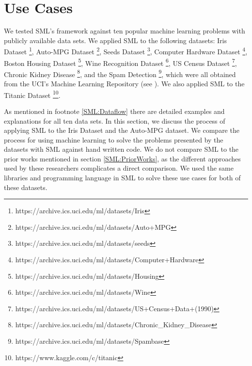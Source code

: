 \section{Use Cases}
\label{use-cases}

We tested SML's framework against ten popular machine learning problems with publicly available data sets. We applied SML to the following datasets: Iris Dataset \footnote{https://archive.ics.uci.edu/ml/datasets/Iris}, Auto-MPG Dataset \footnote{https://archive.ics.uci.edu/ml/datasets/Auto+MPG}, Seeds Dataset \footnote{https://archive.ics.uci.edu/ml/datasets/seeds},  Computer Hardware Dataset \footnote{https://archive.ics.uci.edu/ml/datasets/Computer+Hardware},  Boston Housing Dataset \footnote{https://archive.ics.uci.edu/ml/datasets/Housing}, Wine Recognition Dataset \footnote{https://archive.ics.uci.edu/ml/datasets/Wine}, US Census Dataset \footnote{https://archive.ics.uci.edu/ml/datasets/US+Census+Data+(1990)}, Chronic Kidney Disease \footnote{https://archive.ics.uci.edu/ml/datasets/Chronic\_Kidney\_Disease}, and the Spam Detection \footnote{https://archive.ics.uci.edu/ml/datasets/Spambase}, which were all obtained from the UCI's Machine Learning Repository (see \cite{Lichman:2013}).  We also applied SML to the Titanic Dataset \footnote{https://www.kaggle.com/c/titanic}.  

As mentioned in footnote \ref{SML:Dataflow} there are detailed examples and explanations for all ten data sets.  In this section, we discuss the process of applying SML to the Iris Dataset and the Auto-MPG dataset.   We compare the process for using machine learning to solve the problems presented by the datasets with SML against hand written code.  We do not compare SML to the prior works mentioned in section \ref{SML:PriorWorks}, as the different approaches used by these researchers complicates a direct comparison.  We used the same libraries and programming language in SML to solve these use cases for both of these datasets. 

